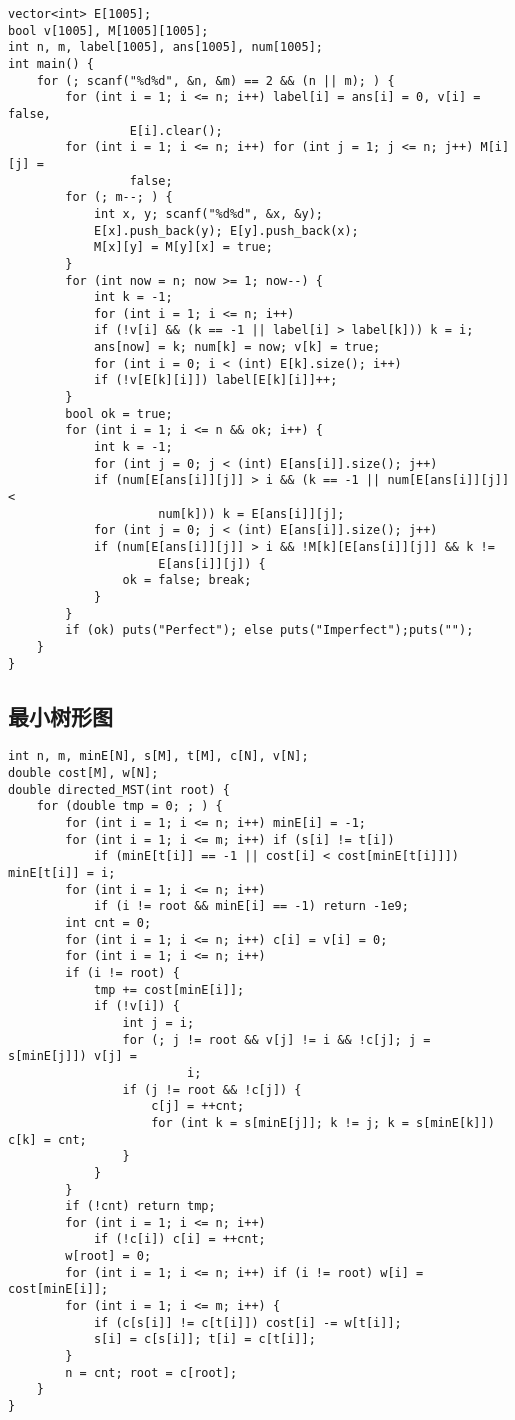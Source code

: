 \documentclass{article}
\begin{document}
\begin{lstlisting}
vector<int> E[1005];
bool v[1005], M[1005][1005];
int n, m, label[1005], ans[1005], num[1005];
int main() {
    for (; scanf("%d%d", &n, &m) == 2 && (n || m); ) {
        for (int i = 1; i <= n; i++) label[i] = ans[i] = 0, v[i] = false,
                 E[i].clear();
        for (int i = 1; i <= n; i++) for (int j = 1; j <= n; j++) M[i][j] =
                 false;
        for (; m--; ) {
            int x, y; scanf("%d%d", &x, &y);
            E[x].push_back(y); E[y].push_back(x);
            M[x][y] = M[y][x] = true;
        }
        for (int now = n; now >= 1; now--) {
            int k = -1;
            for (int i = 1; i <= n; i++)
            if (!v[i] && (k == -1 || label[i] > label[k])) k = i;
            ans[now] = k; num[k] = now; v[k] = true;
            for (int i = 0; i < (int) E[k].size(); i++)
            if (!v[E[k][i]]) label[E[k][i]]++;
        }
        bool ok = true;
        for (int i = 1; i <= n && ok; i++) {
            int k = -1;
            for (int j = 0; j < (int) E[ans[i]].size(); j++)
            if (num[E[ans[i]][j]] > i && (k == -1 || num[E[ans[i]][j]] <
                     num[k])) k = E[ans[i]][j];
            for (int j = 0; j < (int) E[ans[i]].size(); j++)
            if (num[E[ans[i]][j]] > i && !M[k][E[ans[i]][j]] && k !=
                     E[ans[i]][j]) {
                ok = false; break;
            }
        }
        if (ok) puts("Perfect"); else puts("Imperfect");puts("");
    }
}
\end{lstlisting}

\subsection{最小树形图}

\begin{lstlisting}
int n, m, minE[N], s[M], t[M], c[N], v[N];
double cost[M], w[N];
double directed_MST(int root) {
    for (double tmp = 0; ; ) {
        for (int i = 1; i <= n; i++) minE[i] = -1;
        for (int i = 1; i <= m; i++) if (s[i] != t[i])
            if (minE[t[i]] == -1 || cost[i] < cost[minE[t[i]]]) minE[t[i]] = i;
        for (int i = 1; i <= n; i++)
            if (i != root && minE[i] == -1) return -1e9;
        int cnt = 0;
        for (int i = 1; i <= n; i++) c[i] = v[i] = 0;
        for (int i = 1; i <= n; i++)
        if (i != root) {
            tmp += cost[minE[i]];
            if (!v[i]) {
                int j = i;
                for (; j != root && v[j] != i && !c[j]; j = s[minE[j]]) v[j] =
                         i;
                if (j != root && !c[j]) {
                    c[j] = ++cnt;
                    for (int k = s[minE[j]]; k != j; k = s[minE[k]]) c[k] = cnt;
                }
            }
        }
        if (!cnt) return tmp;
        for (int i = 1; i <= n; i++)
            if (!c[i]) c[i] = ++cnt;
        w[root] = 0;
        for (int i = 1; i <= n; i++) if (i != root) w[i] = cost[minE[i]];
        for (int i = 1; i <= m; i++) {
            if (c[s[i]] != c[t[i]]) cost[i] -= w[t[i]];
            s[i] = c[s[i]]; t[i] = c[t[i]];
        }
        n = cnt; root = c[root];
    }
}
\end{lstlisting}
\end{document}
